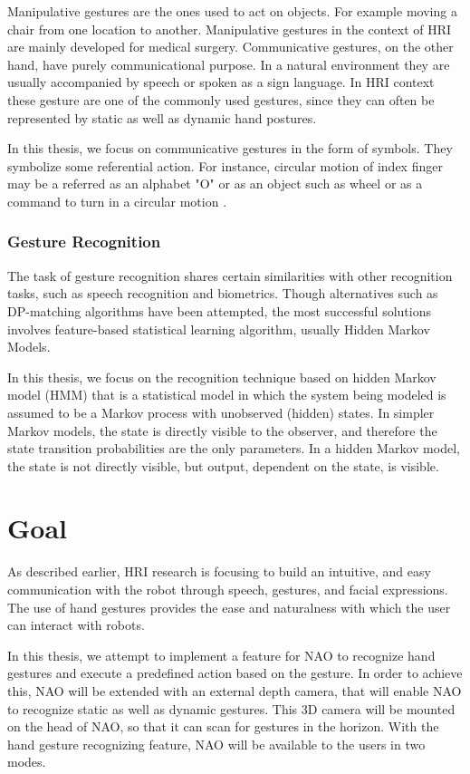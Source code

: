 Manipulative gestures are the ones used to act on objects. For example moving a chair from one location to another. Manipulative gestures in the context of HRI are mainly developed for medical surgery. Communicative gestures, on the other hand, have purely communicational purpose. In a natural environment they are usually accompanied by speech or spoken as a sign language. In HRI context these gesture are one of the commonly used gestures, since they can often be represented by static as well as dynamic hand postures.

In this thesis, we focus on communicative gestures in the form of symbols. They symbolize some referential action. For instance, circular motion of index finger may be a referred as an alphabet "O" or as an object such as wheel or as a command to turn in a circular motion .


\subsection{Gesture Recognition}
The task of gesture recognition shares certain similarities with other recognition tasks, such as speech recognition and biometrics. Though alternatives such as DP-matching algorithms have been attempted, the most successful solutions involves feature-based statistical learning algorithm, usually Hidden Markov Models. 

In this thesis, we focus on the recognition technique based on hidden Markov model (HMM) that is a statistical model in which the system being modeled is assumed to be a Markov process with unobserved (hidden) states. In simpler Markov models, the state is directly visible to the observer, and therefore the state transition probabilities are the only parameters. In a hidden Markov model, the state is not directly visible, but output, dependent on the state, is visible.


\chapter{Goal} As described earlier, HRI research is focusing to build an intuitive, and easy communication with the robot through speech, gestures, and facial expressions. The use of hand gestures provides the ease and naturalness with which the user can interact with robots.

In this thesis, we attempt to implement a feature for NAO to recognize hand gestures and execute a predefined action based on the gesture. In order to achieve this, NAO will be extended with an external depth camera, that will enable NAO to recognize static as well as dynamic gestures. This 3D camera will be mounted on the head of NAO, so that it can scan for gestures in the horizon. With the hand gesture recognizing feature, NAO will be available to the users in two modes.

